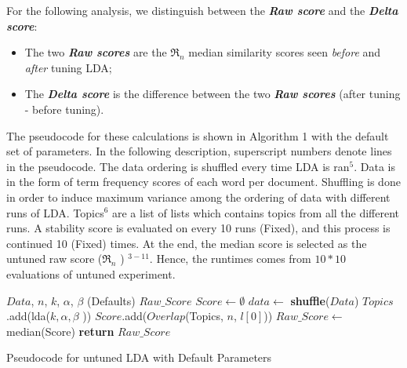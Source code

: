 \documentclass[twocolumn,5p,sort&compress]{elsarticle}
\renewcommand{\algorithmicrequire}{\textbf{Input:}}
\renewcommand{\algorithmicensure}{\textbf{Output:}}
\newcommand{\bi}{\begin{itemize}}
\newcommand{\ei}{\end{itemize}}
\theoremstyle{break}
\begin{document}
 For the following analysis,
we distinguish between the \textbf{\textit{Raw  score}} and the \textbf{\textit{Delta  score}}:
 \bi
\item The two \textbf{\textit{Raw  scores}} are the $\Re_n$ median similarity scores seen {\em before} and {\em after} tuning LDA;
\item The \textbf{\textit{Delta score}} is the difference between the two
  \textbf{\textit{Raw scores}} (after tuning - before tuning).  \ei 
  The pseudocode for these calculations
  is shown in Algorithm 1 with the default set of parameters. In the following
  description, superscript numbers denote lines in the pseudocode. The data ordering is
  shuffled every time LDA is ran$^{5}$. Data is in the form of term frequency
  scores of each word per document. Shuffling is done in order to induce maximum
  variance among the ordering of data with  different runs of LDA. Topics$^{6}$ are a list of lists which
  contains topics from all the different runs. A stability score is evaluated on
  every 10 runs (Fixed), and this process is continued 10 (Fixed) times. At the end, the median
  score is selected as the untuned raw score ($\Re_n$ ) $^{3-11}$. Hence, the runtimes comes from $10 * 10$ evaluations of untuned experiment.

\makeatletter
\algrenewcommand\ALG@beginalgorithmic{\footnotesize}
\algrenewcommand{}
\makeatother
\renewcommand{\algorithmicrequire}{\textbf{Input:}}
\renewcommand{\algorithmicensure}{\textbf{Output:}}
\begin{algorithm}
    
    \begin{algorithmic}[1]
    \Require $Data$, $n$, $k$, $\alpha$, $\beta$ (Defaults) 
    \Ensure $Raw\_Score$    
        \State $Score \leftarrow \emptyset$
                \State $data \leftarrow$ \textbf{shuffle}($Data$)
                \State $Topics$.add(lda($k,\alpha,\beta$ ))
            \EndFor
            \State $Score$.add($Overlap$(Topics, $n$, $l[0]$))
        \EndFor
        \State $Raw\_Score \leftarrow $ median(Score)
        \State \textbf{return} $Raw\_Score$
    \EndFunction
    \caption{Pseudocode for untuned LDA with Default Parameters}
    \end{algorithmic}
\end{algorithm}
\end{document}
